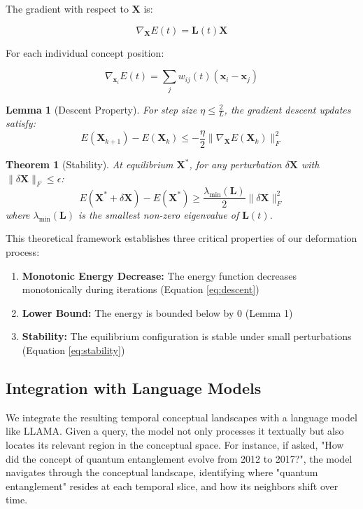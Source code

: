 \documentclass{article}
\newtheorem{theorem}{Theorem}
\newtheorem{lemma}{Lemma}
\begin{document}
The gradient with respect to $\mathbf{X}$ is:

\begin{equation}
\nabla_\mathbf{X}E(t) = \mathbf{L}(t)\mathbf{X}
\label{eq:gradient}
\end{equation}

For each individual concept position:

\begin{equation}
\nabla_{\mathbf{x}_i}E(t) = \sum_j w_{ij}(t)(\mathbf{x}_i - \mathbf{x}_j)
\label{eq:position_gradient}
\end{equation}

\begin{lemma}[Descent Property]
For step size $\eta \leq \frac{2}{L}$, the gradient descent updates satisfy:
\begin{equation}
E(\mathbf{X}_{k+1}) - E(\mathbf{X}_k) \leq -\frac{\eta}{2}\|\nabla_\mathbf{X}E(\mathbf{X}_k)\|_F^2
\label{eq:descent}
\end{equation}
\end{lemma}

\begin{theorem}[Stability]
At equilibrium $\mathbf{X}^*$, for any perturbation $\delta\mathbf{X}$ with $\|\delta\mathbf{X}\|_F \leq \epsilon$:
\begin{equation}
E(\mathbf{X}^* + \delta\mathbf{X}) - E(\mathbf{X}^*) \geq \frac{\lambda_{\min}(\mathbf{L})}{2}\|\delta\mathbf{X}\|_F^2
\label{eq:stability}
\end{equation}
where $\lambda_{\min}(\mathbf{L})$ is the smallest non-zero eigenvalue of $\mathbf{L}(t)$.
\end{theorem}

This theoretical framework establishes three critical properties of our deformation process:

\begin{enumerate}
    \item \textbf{Monotonic Energy Decrease:} The energy function decreases monotonically during iterations (Equation \ref{eq:descent})
    \item \textbf{Lower Bound:} The energy is bounded below by 0 (Lemma 1)
    \item \textbf{Stability:} The equilibrium configuration is stable under small perturbations (Equation \ref{eq:stability})
\end{enumerate}

\subsection{Integration with Language Models}
We integrate the resulting temporal conceptual landscapes with a language model like LLAMA. Given a query, the model not only processes it textually but also locates its relevant region in the conceptual space. For instance, if asked, "How did the concept of quantum entanglement evolve from 2012 to 2017?", the model navigates through the conceptual landscape, identifying where "quantum entanglement" resides at each temporal slice, and how its neighbors shift over time.
\end{document}
